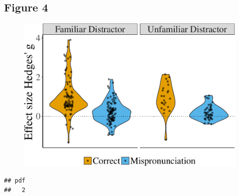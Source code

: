 \documentclass[man]{apa6}
\theoremstyle{definition}
\theoremstyle{definition}
\theoremstyle{definition}
\theoremstyle{remark}
\begin{document}
\subsection{Figure 4}\label{figure-4}

\begin{figure}[htbp]
\centering
\includegraphics{Paper_Analyses_files/figure-latex/PlotDistFamEffect_NoAge-1.pdf}
\caption{}
\end{figure}

\begin{verbatim}
## pdf 
##   2
\end{verbatim}
\end{document}
